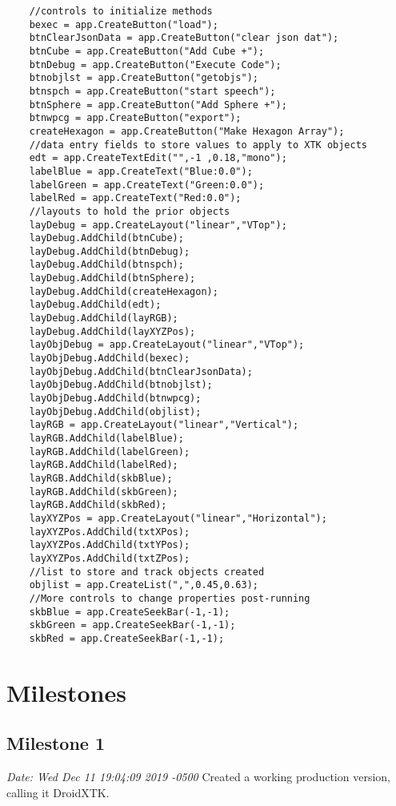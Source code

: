 \documentclass[sigconf]{acmart}
\begin{document}
    \begin{verbatim}
    //controls to initialize methods
    bexec = app.CreateButton("load");
    btnClearJsonData = app.CreateButton("clear json dat");
    btnCube = app.CreateButton("Add Cube +");
    btnDebug = app.CreateButton("Execute Code");
    btnobjlst = app.CreateButton("getobjs");
    btnspch = app.CreateButton("start speech");
    btnSphere = app.CreateButton("Add Sphere +");
    btnwpcg = app.CreateButton("export");
    createHexagon = app.CreateButton("Make Hexagon Array");
    //data entry fields to store values to apply to XTK objects
    edt = app.CreateTextEdit("",-1 ,0.18,"mono");
    labelBlue = app.CreateText("Blue:0.0");
    labelGreen = app.CreateText("Green:0.0");
    labelRed = app.CreateText("Red:0.0");
    //layouts to hold the prior objects
    layDebug = app.CreateLayout("linear","VTop");
    layDebug.AddChild(btnCube);
    layDebug.AddChild(btnDebug);
    layDebug.AddChild(btnspch);
    layDebug.AddChild(btnSphere);
    layDebug.AddChild(createHexagon);
    layDebug.AddChild(edt);
    layDebug.AddChild(layRGB);
    layDebug.AddChild(layXYZPos);
    layObjDebug = app.CreateLayout("linear","VTop");
    layObjDebug.AddChild(bexec);
    layObjDebug.AddChild(btnClearJsonData);
    layObjDebug.AddChild(btnobjlst);
    layObjDebug.AddChild(btnwpcg);
    layObjDebug.AddChild(objlist);
    layRGB = app.CreateLayout("linear","Vertical");
    layRGB.AddChild(labelBlue);
    layRGB.AddChild(labelGreen);
    layRGB.AddChild(labelRed);
    layRGB.AddChild(skbBlue);
    layRGB.AddChild(skbGreen);
    layRGB.AddChild(skbRed);
    layXYZPos = app.CreateLayout("linear","Horizontal");
    layXYZPos.AddChild(txtXPos);
    layXYZPos.AddChild(txtYPos);
    layXYZPos.AddChild(txtZPos);
    //list to store and track objects created
    objlist = app.CreateList(",",0.45,0.63);
    //More controls to change properties post-running
    skbBlue = app.CreateSeekBar(-1,-1);
    skbGreen = app.CreateSeekBar(-1,-1);
    skbRed = app.CreateSeekBar(-1,-1);
    \end{verbatim}
    
    \newpage
    
    \section{Milestones}
    
    \subsection{Milestone 1}
    \textit{Date:   Wed Dec 11 19:04:09 2019 -0500}\newline
    Created a working production version, calling it DroidXTK.
    
\end{document}
